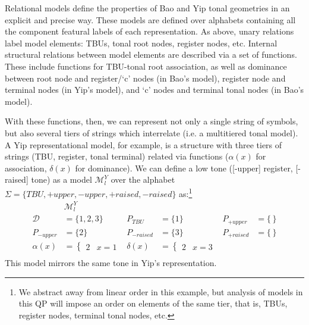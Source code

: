\documentclass{article}
\begin{document}
Relational models define the properties of Bao and Yip tonal geometries in an explicit and precise way. These models are defined over alphabets containing all the component featural labels of each representation. As above, unary relations label model elements: TBUs, tonal root nodes, register nodes, etc. Internal structural relations between model elements are described via a set of functions. These include functions for TBU-tonal root association, as well as dominance between root node and register/`c' nodes (in Bao's model), register node and terminal nodes (in Yip's model), and `c' nodes and terminal tonal nodes (in Bao's model). \par
With these functions, then, we can represent not only a single string of symbols, but also several tiers of strings which interrelate (i.e. a multitiered tonal model). A Yip representational model, for example, is a structure with three tiers of strings (TBU, register, tonal terminal) related via functions ($\alpha(x)$ for association, $\delta(x)$ for dominance). We can define a low tone ([-upper] register, [-raised] tone) as a model $\mathcal{M}^{Y}_{l}$ over the alphabet $\Sigma = \{TBU, +upper, -upper, +raised, -raised\}$ as:\footnote{We abstract away from linear order in this example, but analysis of models in this QP will impose an order on elements of the same tier, that is, TBUs, register nodes, terminal tonal nodes, etc.} 
\begin{equation}
\begin{aligned}
&\mathcal{M}^{Y}_{l} \\
\mathcal{D}&= \{1,2,3\} & P_{TBU}&=\{1\} & P_{+upper}&=\{\,\} \\
P_{-upper}&=\{2\} & P_{-raised}&=\{3\} & P_{+raised}&=\{\,\} \\
\alpha(x)&= \begin{cases} 2 & x=1\end{cases} & \delta(x)&= \begin{cases} 2 & x=3 \end{cases}\\
\end{aligned}
\end{equation}
This model mirrors the same tone in Yip's representation.
\end{document}
